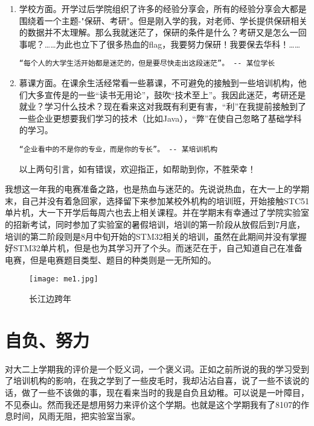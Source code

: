 \documentclass[cn,11pt]{elegantbook}
\begin{document}
\begin{enumerate}
\item 学校方面。开学过后学院组织了许多的经验分享会，所有的经验分享会大都是围绕着一个主题-"保研、考研"。但是刚入学的我，对老师、学长提供保研相关的数据并不太理解。那么我就迷茫了，保研的条件是什么？考研又是怎么一回事呢？……为此也立下了很多热血的flag，我要努力保研！我要保去华科！……

\begin{lstlisting}
“每个人的大学生活开始都是迷茫的，但是要尽快走出这段迷茫”。 -- 某位学长
\end{lstlisting}

\item 慕课方面。在课余生活经常看一些慕课，不可避免的接触到一些培训机构，他们大多宣传是的一些“读书无用论”，鼓吹“技术至上”。我因此迷茫，考研还是就业？学习什么技术？现在看来这对我既有利更有害，“利”在我提前接触到了一些企业更想要我们学习的技术（比如Java），“弊”在使自己忽略了基础学科的学习。

\begin{lstlisting}
“企业看中的不是你的专业，而是你的专长”。 -- 某培训机构
\end{lstlisting}
\begin{remark}
	以上两句引言，如有错误，欢迎指正，如帮助到你，不胜荣幸！
\end{remark}
\end{enumerate}

我想这一年我的电赛准备之路，也是热血与迷茫的。先说说热血，在大一上的学期末，自己并没有着急回家，选择留下来参加某校外机构的培训班，开始接触STC51单片机，大一下开学后每周六也去上相关课程。并在学期末有幸通过了学院实验室的招新考试，同时参加了实验室的暑假培训，培训的第一阶段从放假后到7月底，培训的第二阶段则是8月中旬开始的STM32相关的培训，虽然在此期间并没有掌握好STM32单片机，但是也为其学习开了个头。而迷茫在于，自己知道自己在准备电赛，但是电赛题目类型、题目的种类则是一无所知的。

\begin{figure}[htbp]
\centering
\texttt{[image: me1.jpg]}
\caption{ 长江边跨年 }
\end{figure}

\section{自负、努力}

对大二上学期我的评价是一个贬义词，一个褒义词。正如之前所说的我的学习受到了培训机构的影响，在我之学到了一些皮毛时，我却沾沾自喜，说了一些不该说的话，做了一些不该做的事，现在看来当时的我是自负且幼稚。可以说是一叶障目，不见泰山。然而我还是想用努力来评价这个学期。也就是这个学期我有了8107的作息时间，风雨无阻，把实验室当家。
\end{document}
